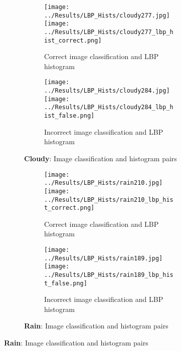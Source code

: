 \documentclass{article}
\begin{document}
\begin{figure}[H]
    \centering
    \begin{subfigure}{\linewidth}
        \centering
        \begin{subfigure}{0.49\linewidth}
            \centering
            \texttt{[image: ../Results/LBP\_Hists/cloudy277.jpg]}
            \texttt{[image: ../Results/LBP\_Hists/cloudy277\_lbp\_hist\_correct.png]}
            \caption*{Correct image classification and LBP histogram}
        \end{subfigure}
        \begin{subfigure}{0.49\linewidth}
            \centering
            \texttt{[image: ../Results/LBP\_Hists/cloudy284.jpg]}
            \texttt{[image: ../Results/LBP\_Hists/cloudy284\_lbp\_hist\_false.png]}
            \caption*{Incorrect image classification and LBP histogram}
        \end{subfigure}
        \caption*{\textbf{Cloudy}: Image classification and histogram pairs}
    \end{subfigure}
    \hfill

    \begin{subfigure}{\linewidth}
        \centering
        \begin{subfigure}{0.49\linewidth}
            \centering
            \texttt{[image: ../Results/LBP\_Hists/rain210.jpg]}
            \texttt{[image: ../Results/LBP\_Hists/rain210\_lbp\_hist\_correct.png]}
            \caption*{Correct image classification and LBP histogram}
        \end{subfigure}
        \begin{subfigure}{0.49\linewidth}
            \centering
            \texttt{[image: ../Results/LBP\_Hists/rain189.jpg]}
            \texttt{[image: ../Results/LBP\_Hists/rain189\_lbp\_hist\_false.png]}
            \caption*{Incorrect image classification and LBP histogram}
        \end{subfigure}
        \caption*{\textbf{Rain}: Image classification and histogram pairs}
    \end{subfigure}
    \hfill


\end{figure}
\end{document}

